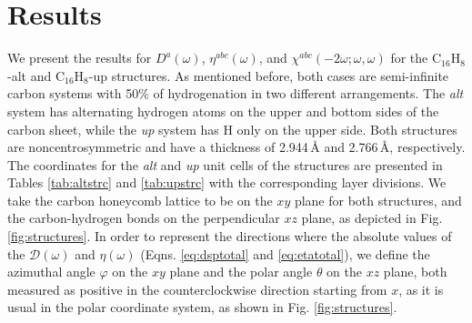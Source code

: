 \documentclass[pss]{wiley2sp} %
\begin{document}
\section{Results}\label{sec:results}

We present the results for {$D^{a}(\omega)$}, {$\eta^{abc}(\omega)$}, and
$\chi^{abc}(-2\omega;\omega,\omega)$ for the C$_{16}$H$_{8}$-alt and
C$_{16}$H$_{8}$-up structures. As mentioned before, both cases are 
semi-infinite carbon systems with 50\% of hydrogenation in two different
arrangements. The \emph{alt} system has alternating hydrogen atoms on the
upper and bottom sides of the carbon sheet, while the \emph{up} system has H
only on the upper side. Both structures are noncentrosymmetric and have a
thickness of 2.944\,{\AA} and 2.766\,{\AA}, respectively. The coordinates for
the \emph{alt} and \emph{up} unit cells of the structures are presented in
Tables \ref{tab:altstrc} and \ref{tab:upstrc} with the corresponding layer
divisions. We take the carbon honeycomb lattice to be on the $xy$ plane for
both structures, and the carbon-hydrogen bonds on the perpendicular $xz$ plane,
as depicted in Fig.\ref{fig:structures}. In order to represent the directions
where the absolute values of the $\mathcal{D}(\omega)$ and $\eta(\omega)$
(Eqns. \eqref{eq:dsptotal} and \eqref{eq:etatotal}), we define the azimuthal
angle $\varphi$ on the $xy$ plane and the polar angle $\theta$ on the $xz$
plane, both measured as positive in the counterclockwise direction
starting from $x$, as it is
usual in the polar coordinate system, as shown in Fig. \ref{fig:structures}.
\end{document}
